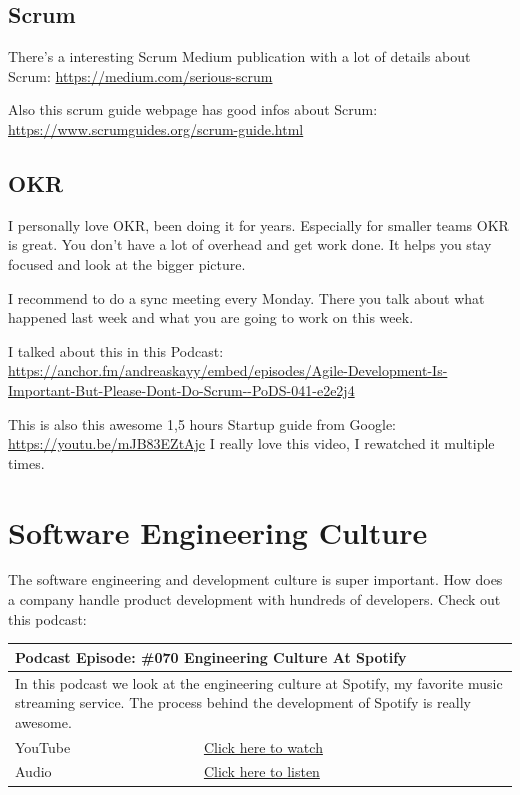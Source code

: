 \documentclass[12pt, numbers=noenddot]{scrreprt} %
\begin{document}
\subsection{Scrum}

There's a interesting Scrum Medium publication with a lot of details about Scrum: \url{https://medium.com/serious-scrum}

Also this scrum guide webpage has good infos about Scrum: \url{https://www.scrumguides.org/scrum-guide.html}

\subsection{OKR}

I personally love OKR, been doing it for years. Especially for smaller teams OKR is great. You don't have a lot of overhead and get work done.
It helps you stay focused and look at the bigger picture. 

I recommend to do a sync meeting every Monday. There you talk about what happened last week and what you are going to work on this week.

I talked about this in this Podcast: \url{https://anchor.fm/andreaskayy/embed/episodes/Agile-Development-Is-Important-But-Please-Dont-Do-Scrum--PoDS-041-e2e2j4}

This is also this awesome 1,5 hours Startup guide from Google: \url{https://youtu.be/mJB83EZtAjc} I really love this video, I rewatched it multiple times.

\section{Software Engineering Culture}

The software engineering and development culture is super important. How does a company handle product development with hundreds of developers. Check out this podcast:

\begin{table}[h]
\begin{tabular}{ll}
\hline
\multicolumn{2}{l}{\textbf{Podcast Episode:} \#070 Engineering Culture At Spotify} \\ \hline
\multicolumn{2}{p{15cm}}{In this podcast we look at the engineering culture at Spotify, my favorite music streaming service. 
The process behind the development of Spotify is really awesome.}         \\ \hline
\multicolumn{1}{l|}{YouTube}   & \href{https://youtu.be/1asVrsUDbp0}{Click here to watch}   \\ 
\multicolumn{1}{l|}{Audio}     & \href{https://anchor.fm/andreaskayy/episodes/070-The-Engineering-Culture-At-Spotify-e45ipa}{Click here to listen}   \\ \hline
\end{tabular}
\end{table}
\end{document}

